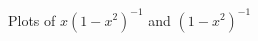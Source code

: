 \begin{figure}[htpb]
    \centering
    
    \caption{Plots of $x(1-x^2)^{-1}$ and $(1-x^2)^{-1}$}
    \label{fig:cauchypdf}
\end{figure}
